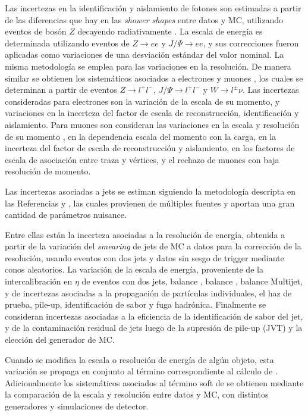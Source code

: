 Las incertezas en la identificación y aislamiento de fotones son estimadas a partir de las diferencias que hay en las \textit{shower shapes}
entre datos y MC, utilizando eventos de bosón $Z$ decayendo radiativamente \cite{PERF-2013-04}. La escala de energía es determinada utilizando eventos de $Z\to ee$ y $J/\Psi \to ee$, y sus correcciones fueron aplicadas como variaciones de una desviación estándar del valor nominal. La misma metodología se emplea para las variaciones en la resolución.
De manera similar se obtienen los sistemáticos asociados a electrones \cite{ATLAS-CONF-2014-032} y muones \cite{PERF-2015-10}, los cuales se determinan a partir de eventos $Z\to l^+l^-$, $J/\Psi\to l^+l^-$ y $W\to l^\pm \nu$. 
Las incertezas consideradas para electrones son la variación de la escala de su momento, y variaciones en la incerteza del factor de escala de reconstrucción, identificación y aislamiento.
Para muones son consideran las variaciones en la escala y resolución de su momento 
, en la dependencia escala del momento con la carga, en la incerteza del factor de escala de reconstrucción y aislamiento, en los factores de escala de asociación entre traza y vértices, y el rechazo de muones con baja resolución de momento.




Las incertezas asociadas a jets se estiman siguiendo la metodología descripta en las Referencias \cite{PERF-2011-03} y \cite{ATLAS-CONF-2015-037}, las cuales provienen de múltiples fuentes y aportan una gran cantidad de parámetros nuisance. 


Entre ellas están la incerteza asociadas a la resolución de energía, obtenida a partir de la variación del \textit{smearing} de jets de MC a datos para la corrección de la resolución, usando eventos con dos jets y datos sin sesgo de trigger mediante conos aleatorios.
La variación de la escala de energía, proveniente de la intercalibración en $\eta$ de eventos con dos jets, balance \zj, balance \phj, balance Multijet, y de incertezas asociadas a la propagación de partículas individuales, el haz de prueba, pile-up, identificación de sabor y fuga hadrónica.
Finalmente se consideran incertezas asociadas a la eficiencia de la identificación de sabor del jet, y de la contaminación residual de jets luego de la supresión de pile-up (JVT) y la elección del generador de MC.




Cuando se modifica la escala o resolución de energía de algún objeto, esta variación se propaga en conjunto al término correspondiente al cálculo de \met. Adicionalmente los sistemáticos asociados al término soft de \met se obtienen mediante la comparación de la escala y resolución entre datos y MC, con distintos generadores y simulaciones de detector.




